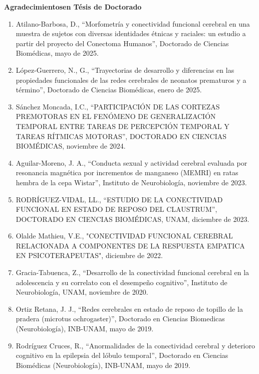\textbf{Agradecimientosen Tésis de Doctorado}

\begin{enumerate}
\item Atilano-Barbosa, D., “Morfometría y conectividad funcional cerebral en una muestra de sujetos con diversas identidades 
étnicas y raciales: un estudio a partir del proyecto del Conectoma Humanos”, Doctorado de Ciencias Biomédicas, mayo de 2025.

\item  López-Guerrero, N., G., “Trayectorias de desarrollo y diferencias en las propiedades funcionales de las redes cerebrales 
de 
neonatos prematuros y a término”, Doctorado de Ciencias Biomédicas,  enero de 2025.

\item  Sánchez Moncada, I.C., “PARTICIPACIÓN DE LAS CORTEZAS PREMOTORAS EN EL FENÓMENO DE GENERALIZACIÓN TEMPORAL ENTRE TAREAS 
DE 
PERCEPCIÓN TEMPORAL Y TAREAS RÍTMICAS MOTORAS”, DOCTORADO EN CIENCIAS BIOMÉDICAS, noviembre de 
2024.

\item  Aguilar-Moreno, J. A., “Conducta sexual y actividad cerebral evaluada por resonancia magnética por incrementos de 
manganeso 
(MEMRI) en ratas hembra de la cepa Wistar”, Instituto de Neurobiología,  noviembre de 2023.

\item  RODRÍGUEZ-VIDAL, LL., “ESTUDIO DE LA CONECTIVIDAD FUNCIONAL EN ESTADO DE REPOSO DEL CLAUSTRUM”, DOCTORADO EN CIENCIAS 
BIOMÉDICAS, UNAM,  diciembre de 2023.

\item  Olalde Mathieu, V.E., "CONECTIVIDAD FUNCIONAL CEREBRAL RELACIONADA A COMPONENTES DE LA RESPUESTA EMPATICA EN 
PSICOTERAPEUTAS",  diciembre de 2022.

\item  Gracia-Tabuenca, Z., “Desarrollo de la conectividad funcional cerebral en la adolescencia y su correlato con el 
desempeño 
cognitivo”, Instituto de Neurobiología, UNAM, noviembre de 2020.

\item  Ortiz Retana, J. J., “Redes cerebrales en estado de reposo de topillo de la pradera (microtus ochrogaster)”, Doctorado 
en 
Ciencias Biomedicas (Neurobiología), INB-UNAM, mayo de 2019.

\item  Rodríguez Cruces, R., “Anormalidades de la conectividad cerebral y deterioro cognitivo en la epilepsia del lóbulo 
temporal”, 
Doctorado en Ciencias Biomédicas (Neurobiología), INB-UNAM, mayo de 2019.


\end{enumerate}
